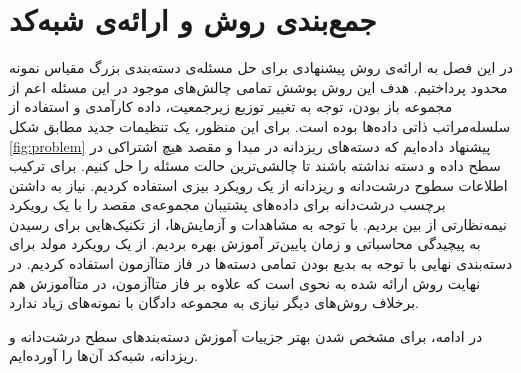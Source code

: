 \section{جمع‌بندی روش و ارائه‌ی شبه‌کد}

در این فصل به ارائه‌ی روش پیشنهادی برای حل مسئله‌ی دسته‌بندی بزرگ مقیاس نمونه محدود پرداختیم. هدف این روش پوشش تمامی چالش‌های موجود در این مسئله اعم از مجموعه باز بودن، توجه به تغییر توزیع زیرجمعیت، داده کارآمدی و استفاده از سلسله‌مراتب ذاتی داده‌ها بوده است. برای این منظور، یک تنظیمات جدید مطابق شکل 
\ref{fig:problem}
پیشنهاد داده‌ایم که دسته‌های ریزدانه در مبدا و مقصد هیچ اشتراکی در سطح داده و دسته نداشته باشند تا چالشی‌ترین حالت مسئله را حل کنیم. برای ترکیب اطلاعات سطوح درشت‌دانه و ریزدانه از یک رویکرد بیزی استفاده کردیم. نیاز به داشتن برچسب درشت‌دانه برای داده‌های پشتیبان مجموعه‌ی مقصد را با یک رویکرد نیمه‌نظارتی از بین بردیم. با توجه به مشاهدات و آزمایش‌ها، از تکنیک‌هایی برای رسیدن به پیچیدگی محاسباتی و زمان پایین‌تر آموزش بهره بردیم. از یک رویکرد مولد برای دسته‌بندی نهایی با توجه به بدیع بودن تمامی دسته‌ها در فاز متاآزمون استفاده کردیم. در نهایت روش ارائه شده به نحوی است که علاوه بر فاز متاآزمون، در متاآموزش هم برخلاف روش‌های دیگر نیازی به مجموعه دادگان با نمونه‌های زیاد ندارد. 

در ادامه، برای مشخص شدن بهتر جزییات آموزش دسته‌بندهای سطح درشت‌دانه و ریزدانه، شبه‌کد آن‌ها را آورده‌ایم.

